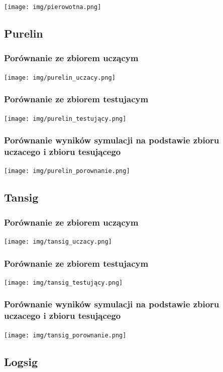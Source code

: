 \documentclass[12pt,titlepage]{article}
\begin{document}
    \newpage
    \begin{landscape}
        \texttt{[image: img/pierowotna.png]}

        \subsection{Purelin}
        \subsubsection{Porównanie ze zbiorem uczącym}
        \texttt{[image: img/purelin\_uczacy.png]}\\
        \subsubsection{Porównanie ze zbiorem testujacym}
        \texttt{[image: img/purelin\_testujący.png]}\\
        \subsubsection{Porównanie wyników symulacji na podstawie zbioru uczacego i zbioru tesującego}
        \texttt{[image: img/purelin\_porownanie.png]}\\

        \subsection{Tansig}
        \subsubsection{Porównanie ze zbiorem uczącym}
        \texttt{[image: img/tansig\_uczacy.png]}\\
        \subsubsection{Porównanie ze zbiorem testujacym}
        \texttt{[image: img/tansig\_testujący.png]}\\
        \subsubsection{Porównanie wyników symulacji na podstawie zbioru uczacego i zbioru tesującego}
        \texttt{[image: img/tansig\_porownanie.png]}\\

        \subsection{Logsig}


\end{landscape}
\end{document}
